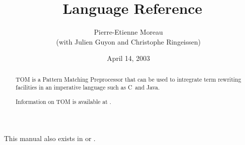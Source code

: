 \documentclass[a4paper]{book}
\title{\TOM\ Language Reference}
\author{Pierre-Etienne Moreau\\(with Julien Guyon and Christophe Ringeissen)}
\date{April 14, 2003}
\newcommand{\Clang}{\textsf{C}}
\newcommand{\Java}{\textsf{Java}}
\begin{document}
\maketitle

\begin{table}[h]
This manual also exists in   or .
\end{table}
\begin{abstract}
TOM is a Pattern Matching Preprocessor that can be used to
intregrate term rewriting facilities in an imperative language such as
\Clang\ and \Java.

Information on TOM is available at .
\end{abstract}

\tableofcontents

%










\end{document}
